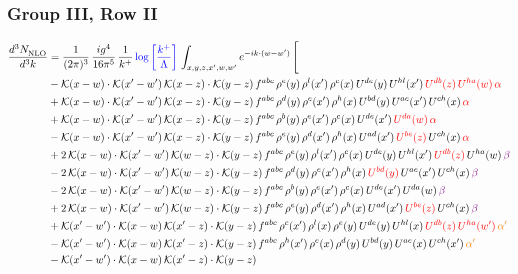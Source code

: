 \documentclass[9pt]{article}
\numberwithin{equation}{section}
\begin{document}
\subsubsection{Group III, Row II}
\begin{align}
     \frac{d^{3}N_{\rm NLO}^{\rm}}{d^{3}k}  & = \frac{1}{(2\pi)^{3}}\, \frac{ig^{4}}{16\pi^{5}}\, \frac{1}{k^{+}}\, {\color{blue}\log{\left[\frac{k^{+}}{\Lambda}\right]}}\,\int_{x,y,z,x^{\prime},w,w^{\prime}}e^{-ik\cdot (w-w')}\, \Bigg[\notag \\ & -\mathcal{K}(x-w)\cdot \mathcal{K}(x'-w')\, \mathcal{K}(x-z)\cdot \mathcal{K}(y-z)\, f^{abc}\, \rho^{e}(y)\,\rho^{l}(x')\,\rho^{c}(x)\,U^{de}(y)\,U^{hl}(x')\,{\color{red}U^{db}(z)}\,{\color{red}U^{ha}(w)}\, {\color{red}\alpha} \notag \\ & +\mathcal{K}(x-w)\cdot \mathcal{K}(x'-w')\, \mathcal{K}(x-z)\cdot \mathcal{K}(y-z)\, f^{abc}\, \rho^{d}(y)\,\rho^{e}(x')\,\rho^{h}(x)\,U^{bd}(y)\,U^{ae}(x')\,U^{ch}(x)\, {\color{red}\alpha} \notag \\ & + \mathcal{K}(x-w)\cdot \mathcal{K}(x'-w')\, \mathcal{K}(x-z)\cdot \mathcal{K}(y-z)\, f^{abc}\, \rho^{b}(y)\,\rho^{e}(x')\,\rho^{c}(x)\,U^{de}(x')\,{\color{red}U^{da}(w)}\, {\color{red}\alpha} \notag \\ & -\mathcal{K}(x-w)\cdot \mathcal{K}(x'-w')\, \mathcal{K}(x-z)\cdot \mathcal{K}(y-z)\, f^{abc}\, \rho^{e}(y)\,\rho^{d}(x')\,\rho^{h}(x)\,U^{ad}(x')\,{\color{red}U^{be}(z)}\,U^{ch}(x)\, {\color{red}\alpha} \notag \\ & +2\, \mathcal{K}(x-w)\cdot \mathcal{K}(x'-w')\, \mathcal{K}(w-z) \cdot \mathcal{K}(y-z)\, f^{abc}\, \rho^{e}(y)\,\rho^{l}(x')\, \rho^{c}(x)\, U^{de}(y)\,U^{hl}(x')\,{\color{red}U^{db}(z)}\,U^{ha}(w)\, {\color{violet} \beta} \notag \\ & -2\, \mathcal{K}(x-w)\cdot \mathcal{K}(x'-w')\, \mathcal{K}(w-z) \cdot \mathcal{K}(y-z)\, f^{abc}\, \rho^{d}(y)\,\rho^{e}(x')\, \rho^{h}(x)\, {\color{red}U^{bd}(y)}\,U^{ae}(x')\,U^{ch}(x)\, {\color{violet} \beta}\notag \\ & -2\, \mathcal{K}(x-w)\cdot \mathcal{K}(x'-w')\, \mathcal{K}(w-z) \cdot \mathcal{K}(y-z)\, f^{abc}\, \rho^{b}(y)\,\rho^{e}(x')\, \rho^{c}(x)\, U^{de}(x')\,U^{da}(w)\, {\color{violet} \beta}\notag \\ & + 2\, \mathcal{K}(x-w)\cdot \mathcal{K}(x'-w')\, \mathcal{K}(w-z) \cdot \mathcal{K}(y-z)\, f^{abc}\, \rho^{e}(y)\,\rho^{d}(x')\, \rho^{h}(x)\, U^{ad}(x')\,{\color{red}U^{be}(z)}\,U^{ch}(x)\, {\color{violet} \beta}\notag \\ & +\mathcal{K}(x'-w')\cdot\mathcal{K}(x-w)\,\mathcal{K}(x'-z)\cdot\mathcal{K}(y-z)\, f^{abc}\,\rho^{c}(x')\,\rho^{l}(x)\,\rho^{e}(y)\,U^{de}(y)\,U^{hl}(x)\,{\color{red}U^{db}(z)}\,{\color{red}U^{ha}(w')}\,{\color{orange} \alpha'}\notag\\ & -\mathcal{K}(x'-w')\cdot\mathcal{K}(x-w)\,\mathcal{K}(x'-z)\cdot\mathcal{K}(y-z)\, f^{abc}\,\rho^{h}(x')\,\rho^{e}(x)\,\rho^{d}(y)\,U^{bd}(y)\,U^{ae}(x)\,U^{ch}(x')\,{\color{orange} \alpha'}\notag\\ &-\mathcal{K}(x'-w')\cdot\mathcal{K}(x-w)\,\mathcal{K}(x'-z)\cdot\mathcal{K}(y-z)\, 
\end{align}
\end{document}
